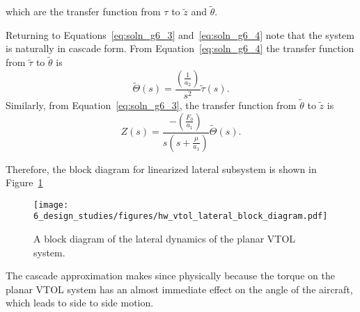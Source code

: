 which are the transfer function from $\tau$ to $\tilde{z}$ and $\tilde{\theta}$.  

Returning to Equations~\eqref{eq:soln_g6_3} and~\eqref{eq:soln_g6_4} note that the system is naturally in cascade form.
From Equation~\eqref{eq:soln_g6_4} the transfer function from $\tilde{\tau}$ to $\tilde{\theta}$ is 
\[
\tilde{\Theta}(s) = \frac{\left(\frac{1}{a_2}\right)}{s^2}\tilde{\tau}(s).
\]
Similarly, from Equation~\eqref{eq:soln_g6_3}, the transfer function from $\tilde{\theta}$ to $\tilde{z}$ is
\[
Z(s) = \frac{-\left(\frac{F_0}{a_1}\right)}{s\left( s+ \frac{\mu}{a_1}\right)} \tilde{\Theta}(s).
\]

Therefore, the block diagram for linearized lateral subsystem is shown in Figure~\ref{fig:hw_vtol_lateral_block_diagram}
\begin{figure}[htbp]
   \centering
   \texttt{[image: 6\_design\_studies/figures/hw\_vtol\_lateral\_block\_diagram.pdf]}
   \caption{A block diagram of the lateral dynamics of the planar VTOL system.}
   \label{fig:hw_vtol_lateral_block_diagram}
\end{figure}

The cascade approximation makes since physically because the torque on the planar VTOL system has an almost immediate effect on the angle of the aircraft, which leads to side to side motion.
